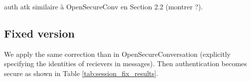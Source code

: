 \TODO auth atk similaire à OpenSecureConv en Section 2.2 (montrer ?). 

\subsection{Fixed version}

We apply the same correction than in OpenSecureConversation (explicitly
specifying the identities of recievers in messages).
Then authentication becomes secure as shown in Table \ref{tab:session_fix_results}.

%
%
%                
%
%                
%                
%                
%
%

